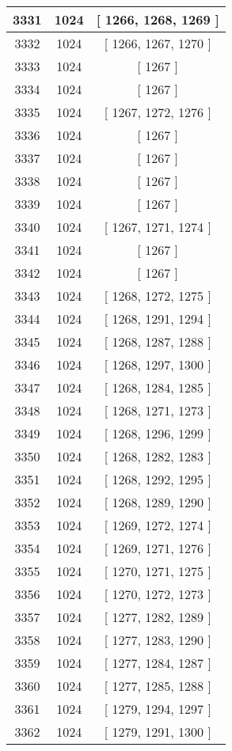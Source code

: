 \begin{center}
\begin{longtable}[H]{|| c c c ||}
\hline
3331 & 1024 & [ 1266, 1268, 1269 ] \\ 
\hline
3332 & 1024 & [ 1266, 1267, 1270 ] \\ 
\hline
3333 & 1024 & [ 1267 ] \\ 
\hline
3334 & 1024 & [ 1267 ] \\ 
\hline
3335 & 1024 & [ 1267, 1272, 1276 ] \\ 
\hline
3336 & 1024 & [ 1267 ] \\ 
\hline
3337 & 1024 & [ 1267 ] \\ 
\hline
3338 & 1024 & [ 1267 ] \\ 
\hline
3339 & 1024 & [ 1267 ] \\ 
\hline
3340 & 1024 & [ 1267, 1271, 1274 ] \\ 
\hline
3341 & 1024 & [ 1267 ] \\ 
\hline
3342 & 1024 & [ 1267 ] \\ 
\hline
3343 & 1024 & [ 1268, 1272, 1275 ] \\ 
\hline
3344 & 1024 & [ 1268, 1291, 1294 ] \\ 
\hline
3345 & 1024 & [ 1268, 1287, 1288 ] \\ 
\hline
3346 & 1024 & [ 1268, 1297, 1300 ] \\ 
\hline
3347 & 1024 & [ 1268, 1284, 1285 ] \\ 
\hline
3348 & 1024 & [ 1268, 1271, 1273 ] \\ 
\hline
3349 & 1024 & [ 1268, 1296, 1299 ] \\ 
\hline
3350 & 1024 & [ 1268, 1282, 1283 ] \\ 
\hline
3351 & 1024 & [ 1268, 1292, 1295 ] \\ 
\hline
3352 & 1024 & [ 1268, 1289, 1290 ] \\ 
\hline
3353 & 1024 & [ 1269, 1272, 1274 ] \\ 
\hline
3354 & 1024 & [ 1269, 1271, 1276 ] \\ 
\hline
3355 & 1024 & [ 1270, 1271, 1275 ] \\ 
\hline
3356 & 1024 & [ 1270, 1272, 1273 ] \\ 
\hline
3357 & 1024 & [ 1277, 1282, 1289 ] \\ 
\hline
3358 & 1024 & [ 1277, 1283, 1290 ] \\ 
\hline
3359 & 1024 & [ 1277, 1284, 1287 ] \\ 
\hline
3360 & 1024 & [ 1277, 1285, 1288 ] \\ 
\hline
3361 & 1024 & [ 1279, 1294, 1297 ] \\ 
\hline
3362 & 1024 & [ 1279, 1291, 1300 ] \\ 

\end{longtable}
\end{center}
